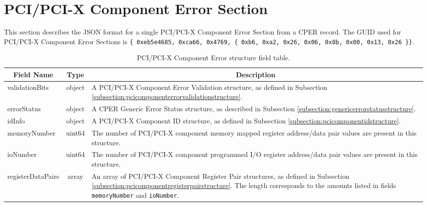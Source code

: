 \documentclass{report}
\newcommand*{\thead}[1]{\multicolumn{1}{|c|}{\bfseries #1}}
\newcommand*{\jsontable}[1]{
    \begin{table}[!ht]
    \label{#1}
    \centering
    \begin{adjustbox}{center}
    \begin{tabular}{|l|c|p{8cm}|}
    \hline
    \thead{Field Name} & \thead{Type} & \thead{Description} \\
    \hline
}
\newcommand*{\jsontableend}[1]{
    \hline
    \end{tabular}
    \end{adjustbox}
    \caption{#1}
    \label{table:#1}
    \end{table}
    \FloatBarrier
}
\begin{document}
\section{PCI/PCI-X Component Error Section}
\label{section:pcicomponenterrorsection}
This section describes the JSON format for a single PCI/PCI-X Component Error Section from a CPER record. The GUID used for PCI/PCI-X Component Error Sections is \texttt{\{ 0xeb5e4685, 0xca66, 0x4769, \{ 0xb6, 0xa2, 0x26, 0x06, 0x8b, 0x00, 0x13, 0x26 \}\}}.
\jsontable{table:pcicomponenterrorsection}
validationBits & object & A PCI/PCI-X Component Error Validation structure, as defined in Subsection \ref{subsection:pcicomponenterrorvalidationstructure}.\\
\hline
errorStatus & object & A CPER Generic Error Status structure, as described in Subsection \ref{subsection:genericerrorstatusstructure}.\\
\hline
idInfo & object & A PCI/PCI-X Component ID structure, as defined in Subsection \ref{subsection:pcicomponentidstructure}.\\
\hline
memoryNumber & uint64 & The number of PCI/PCI-X component memory mapped register address/data pair values are present in this structure.\\
\hline
ioNumber & uint64 & The number of PCI/PCI-X component programmed I/O register address/data pair values are present in this structure.\\
\hline
registerDataPairs & array & An array of PCI/PCI-X Component Register Pair structures, as defined in Subsection \ref{subsection:pcicomponentregisterpairstructure}. The length corresponds to the amounts listed in fields \texttt{memoryNumber} and \texttt{ioNumber}.\\
\jsontableend{PCI/PCI-X Component Error structure field table.}

\end{document}
